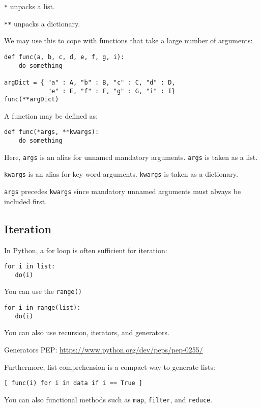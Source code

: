 \documentclass{article}
\begin{document}
\texttt{*} unpacks a list.

\texttt{*}\texttt{*} unpacks a dictionary.

We may use this to cope with functions that take a large
number of arguments:

\begin{verbatim}
def func(a, b, c, d, e, f, g, i):
    do something

argDict = { "a" : A, "b" : B, "c" : C, "d" : D, 
            "e" : E, "f" : F, "g" : G, "i" : I}
func(**argDict)
\end{verbatim}

A function may be defined as:

\begin{verbatim}
def func(*args, **kwargs):
    do something
\end{verbatim}

Here, \texttt{args} is an alias for unnamed mandatory arguments.
\texttt{args} is taken as a list.

\texttt{kwargs} is an alias for key word arguments.
\texttt{kwargs} is taken as a dictionary.

\texttt{args} precedes \texttt{kwargs} since mandatory unnamed arguments must always be included first. 

\subsection{Iteration}

In Python, a for loop is often sufficient for iteration:
\begin{verbatim}
for i in list:
   do(i)
\end{verbatim}
You can use the \texttt{range()}
\begin{verbatim}
for i in range(list):
   do(i)
\end{verbatim}
You can also use recursion, iterators, and generators.

Generators PEP: \url{https://www.python.org/dev/peps/pep-0255/}

Furthermore, list comprehension is a compact way to generate lists:

\begin{verbatim}
[ func(i) for i in data if i == True ]
\end{verbatim}

You can also functional methods such as \texttt{map}, \texttt{filter}, and \texttt{reduce}.
\end{document}
